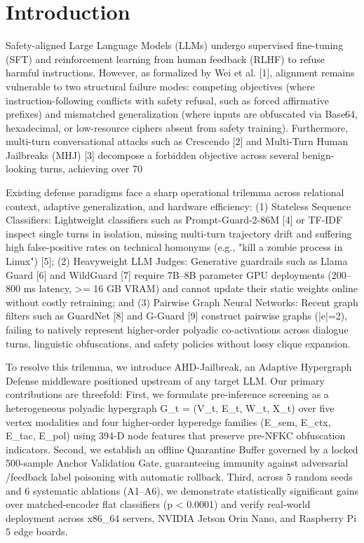 \documentclass[10pt,twocolumn]{article}
\begin{document}
\section{Introduction}
Safety-aligned Large Language Models (LLMs) undergo supervised fine-tuning (SFT) and reinforcement learning from human feedback (RLHF) to refuse harmful instructions. However, as formalized by Wei et al. [1], alignment remains vulnerable to two structural failure modes: competing objectives (where instruction-following conflicts with safety refusal, such as forced affirmative prefixes) and mismatched generalization (where inputs are obfuscated via Base64, hexadecimal, or low-resource ciphers absent from safety training). Furthermore, multi-turn conversational attacks such as Crescendo [2] and Multi-Turn Human Jailbreaks (MHJ) [3] decompose a forbidden objective across several benign-looking turns, achieving over 70%

Existing defense paradigms face a sharp operational trilemma across relational context, adaptive generalization, and hardware efficiency: (1) Stateless Sequence Classifiers: Lightweight classifiers such as Prompt-Guard-2-86M [4] or TF-IDF inspect single turns in isolation, missing multi-turn trajectory drift and suffering high false-positive rates on technical homonyms (e.g., "kill a zombie process in Linux") [5]; (2) Heavyweight LLM Judges: Generative guardrails such as Llama Guard [6] and WildGuard [7] require 7B–8B parameter GPU deployments (200–800 ms latency, >= 16 GB VRAM) and cannot update their static weights online without costly retraining; and (3) Pairwise Graph Neural Networks: Recent graph filters such as GuardNet [8] and G-Guard [9] construct pairwise graphs (|e|=2), failing to natively represent higher-order polyadic co-activations across dialogue turns, linguistic obfuscations, and safety policies without lossy clique expansion.

To resolve this trilemma, we introduce AHD-Jailbreak, an Adaptive Hypergraph Defense middleware positioned upstream of any target LLM. Our primary contributions are threefold: First, we formulate pre-inference screening as a heterogeneous polyadic hypergraph G_t = (V_t, E_t, W_t, X_t) over five vertex modalities and four higher-order hyperedge families (E_sem, E_ctx, E_tac, E_pol) using 394-D node features that preserve pre-NFKC obfuscation indicators. Second, we establish an offline Quarantine Buffer governed by a locked 500-sample Anchor Validation Gate, guaranteeing immunity against adversarial /feedback label poisoning with automatic rollback. Third, across 5 random seeds and 6 systematic ablations (A1–A6), we demonstrate statistically significant gains over matched-encoder flat classifiers (p < 0.0001) and verify real-world deployment across x86_64 servers, NVIDIA Jetson Orin Nano, and Raspberry Pi 5 edge boards.
\end{document}
